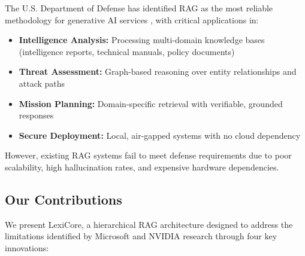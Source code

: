 \documentclass[11pt]{article}
\begin{document}
The U.S. Department of Defense has identified RAG as the most reliable methodology for generative AI services \cite{gdit2024rag}, with critical applications in:

\begin{itemize}
    \item \textbf{Intelligence Analysis:} Processing multi-domain knowledge bases (intelligence reports, technical manuals, policy documents)
    \item \textbf{Threat Assessment:} Graph-based reasoning over entity relationships and attack paths
    \item \textbf{Mission Planning:} Domain-specific retrieval with verifiable, grounded responses
    \item \textbf{Secure Deployment:} Local, air-gapped systems with no cloud dependency
\end{itemize}

However, existing RAG systems fail to meet defense requirements due to poor scalability, high hallucination rates, and expensive hardware dependencies.

\subsection{Our Contributions}

We present LexiCore, a hierarchical RAG architecture designed to address the limitations identified by Microsoft and NVIDIA research through four key innovations:
\end{document}
